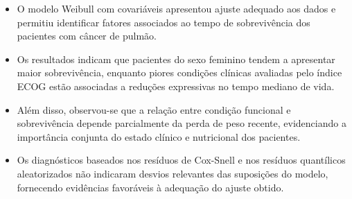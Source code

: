 \documentclass[
  brazilian,
  letterpaper,
  DIV=11,
  numbers=noendperiod]{scrartcl}
\begin{document}
\begin{itemize}
\item
  O modelo Weibull com covariáveis apresentou ajuste adequado aos dados
  e permitiu identificar fatores associados ao tempo de sobrevivência
  dos pacientes com câncer de pulmão.
\item
  Os resultados indicam que pacientes do sexo feminino tendem a
  apresentar maior sobrevivência, enquanto piores condições clínicas
  avaliadas pelo índice ECOG estão associadas a reduções expressivas no
  tempo mediano de vida.
\item
  Além disso, observou-se que a relação entre condição funcional e
  sobrevivência depende parcialmente da perda de peso recente,
  evidenciando a importância conjunta do estado clínico e nutricional
  dos pacientes.
\item
  Os diagnósticos baseados nos resíduos de Cox-Snell e nos resíduos
  quantílicos aleatorizados não indicaram desvios relevantes das
  suposições do modelo, fornecendo evidências favoráveis à adequação do
  ajuste obtido.
\end{itemize}
\end{document}
